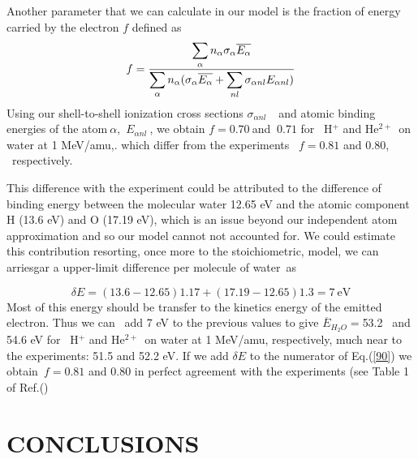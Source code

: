 \documentclass[preprint,showpacs,pra]{revtex4}
\begin{document}
Another parameter that we can calculate in our model is the fraction of
energy carried by the electron $f$ defined as%
\begin{equation}
f=\frac{\dsum\limits_{\alpha }n_{\alpha }\sigma _{\alpha }\overline{%
E_{\alpha }}}{\dsum\limits_{\alpha }n_{\alpha }(\sigma _{\alpha }\overline{%
E_{\alpha }}+\dsum\limits_{nl}\sigma _{\alpha nl}E_{\alpha nl})}  \label{90}
\end{equation}%
Using our shell-to-shell ionization cross sections $\sigma _{\alpha nl}\ $%
\cite{miraglia2019}\ and atomic binding energies of the atom$\ \alpha ,$ $%
E_{\alpha nl}\ $\cite{clementi}, we obtain $f=$0$.70\ $and $\ 0.71$ for \ H$%
^{+}$ and He$^{2+~}$ on water at 1 MeV/amu,. which differ from the
experiments \ $f=0.81$ and $0.80$, \ respectively.

This difference with the experiment could be attributed to the difference of
binding energy between the molecular water 12.65 eV and the atomic component
H (13.6 eV) and O (17.19 eV), which is an issue beyond our independent atom
approximation and so our model cannot not accounted for. We could estimate
this contribution resorting, once more to the stoichiometric, model, we can
arriesgar a upper-limit difference per molecule of water\ as

\begin{equation}
\delta E=(13.6-12.65)1.17+(17.19-12.65)1.3=7\ \text{eV}  \label{80}
\end{equation}%
Most of this energy should be transfer to the kinetics energy of the emitted
electron. Thus we can \ add 7 eV to the previous values to give $\overline{E}%
_{H_{2}O}=$53.2 \ and 54.6 eV for \ H$^{+}$ and He$^{2+~}$ on water at 1
MeV/amu, respectively, much near to the experiments: 51.5 and 52.2 eV. If we
add $\delta E$ to the numerator of Eq.(\ref{90}) we obtain\ $f=0.81$ and $%
0.80$ in perfect agreement with the experiments (see Table 1 of Ref.(\cite%
{pimblott2007})

\section{CONCLUSIONS}
\end{document}
